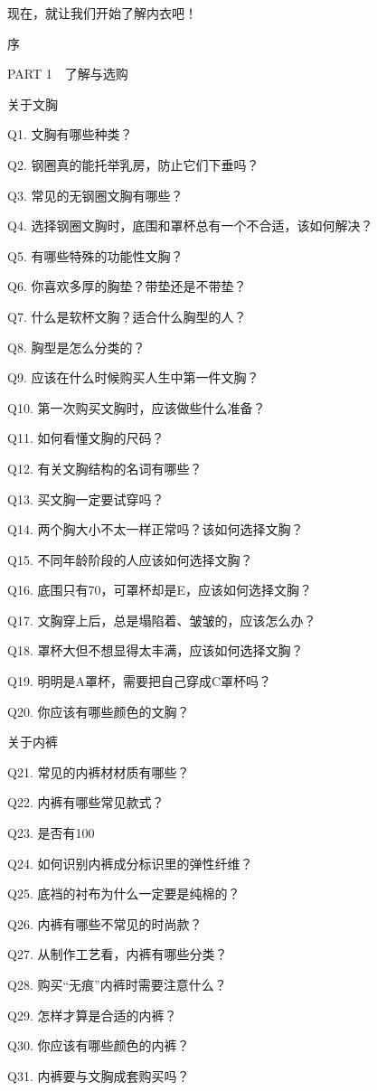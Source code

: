 \documentclass[12pt,UTF8]{ctexbook}
\begin{document}
现在，就让我们开始了解内衣吧！


序

PART 1　了解与选购

关于文胸

Q1. 文胸有哪些种类？

Q2. 钢圈真的能托举乳房，防止它们下垂吗？

Q3. 常见的无钢圈文胸有哪些？

Q4. 选择钢圈文胸时，底围和罩杯总有一个不合适，该如何解决？

Q5. 有哪些特殊的功能性文胸？

Q6. 你喜欢多厚的胸垫？带垫还是不带垫？

Q7. 什么是软杯文胸？适合什么胸型的人？

Q8. 胸型是怎么分类的？

Q9. 应该在什么时候购买人生中第一件文胸？

Q10. 第一次购买文胸时，应该做些什么准备？

Q11. 如何看懂文胸的尺码？

Q12. 有关文胸结构的名词有哪些？

Q13. 买文胸一定要试穿吗？

Q14. 两个胸大小不太一样正常吗？该如何选择文胸？

Q15. 不同年龄阶段的人应该如何选择文胸？

Q16. 底围只有70，可罩杯却是E，应该如何选择文胸？

Q17. 文胸穿上后，总是塌陷着、皱皱的，应该怎么办？

Q18. 罩杯大但不想显得太丰满，应该如何选择文胸？

Q19. 明明是A罩杯，需要把自己穿成C罩杯吗？

Q20. 你应该有哪些颜色的文胸？

关于内裤

Q21. 常见的内裤材材质有哪些？

Q22. 内裤有哪些常见款式？

Q23. 是否有100%

Q24. 如何识别内裤成分标识里的弹性纤维？

Q25. 底裆的衬布为什么一定要是纯棉的？

Q26. 内裤有哪些不常见的时尚款？

Q27. 从制作工艺看，内裤有哪些分类？

Q28. 购买“无痕”内裤时需要注意什么？

Q29. 怎样才算是合适的内裤？

Q30. 你应该有哪些颜色的内裤？

Q31. 内裤要与文胸成套购买吗？
\end{document}
